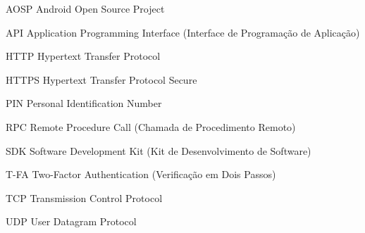 
\begin{siglas}
  \item[AOSP] Android Open Source Project
  \item[API] Application Programming Interface (Interface de Programação de Aplicação)
  \item[HTTP] Hypertext Transfer Protocol
  \item[HTTPS] Hypertext Transfer Protocol Secure  
  \item[PIN] Personal Identification Number
  \item[RPC] Remote Procedure Call (Chamada de Procedimento Remoto)
  \item[SDK] Software Development Kit (Kit de Desenvolvimento de Software)
  \item[T-FA] Two-Factor Authentication (Verificação em Dois Passos)  
  \item[TCP] Transmission Control Protocol    
  \item[UDP] User Datagram Protocol
\end{siglas}

